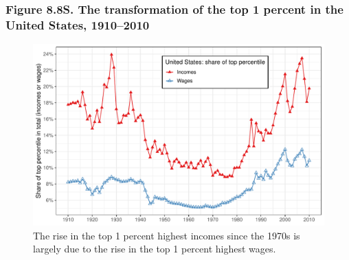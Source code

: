 \documentclass[t]{beamer}\usepackage[]{graphicx}\usepackage[]{color}
\newenvironment{knitrout}{}{} %
\begin{document}
\begin{frame}[label=Figure_8_8S,fragile]
\frametitle{Figure 8.8S. The transformation of the top 1 percent in the United States, 1910--2010}
\begin{figure}[t]
\begin{minipage}[b]{\textwidth}
\centering 
\begin{knitrout}\footnotesize
{}\color{fgcolor}

{\centering \includegraphics[width=1\linewidth]{figures/color/Figure_8_8S} 

}



\end{knitrout}
\caption{The rise in the top 1 percent highest incomes since the 1970s is largely due to the rise in the top 1 percent highest wages.}
\end{minipage}
\end{figure}
\end{frame}
\end{document}
